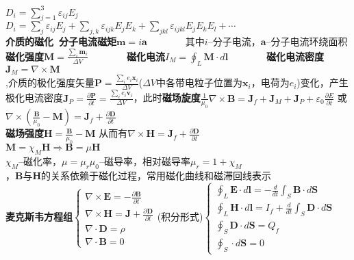 \documentclass[10pt,a4paper]{article}
\begin{document}
\begin{multicols}{2}
\indent{}$D_i=\sum_{j=1}^3\varepsilon_{ij}E_{j}$\scriptsize\\
\indent{}$D_i=\sum_{j}\varepsilon_{ij}E_j+\sum_{j,k}\varepsilon_{ijk}E_jE_k+\sum_{jkl}\varepsilon_{ijkl}E_jE_kE_l+\cdots$\scriptsize\\
\textbf{介质的磁化~分子电流磁矩}$\bm{m}=i\bm{a}$~~~~~~~~其中$i$--分子电流，$\bm{a}$--分子电流环绕面积\\
\indent\textbf{磁化强度}$\bm{M}=\frac{\sum_i\bm{m}_i}{\Delta V}$~~~~~~~~\textbf{磁化电流}$I_M=\oint_L\bm{M}\cdot d\bm{l}$~~~~~~~~\textbf{磁化电流密度}$\bm{J}_M=\nabla\times\bm{M}$\\
\indent{},介质的极化强度矢量$\bm{P}=\frac{\sum_ie_i\bm{x}_i}{\Delta V}$($\Delta V$中各带电粒子位置为$\bm{x}_i$，电荷为$e_i$)变化，产生极化电流密度$\bm{J}_P=\frac{\partial\bm{P}}{\partial t}=\frac{\sum_ie_i\bm{v}_i}{\Delta V}$，此时\textbf{磁场旋度}$\frac{1}{\mu_0}\nabla\times\bm{B}=\bm{J}_f+\bm{J}_M+\bm{J}_P+\varepsilon_0\frac{\partial E}{\partial t}$ 或 \scriptsize$\nabla\times(\frac{\bm{B}}{\mu_0}-\bm{M})=\bm{J}_f+\frac{\partial\bm{D}}{\partial t}$\\
\textbf{磁场强度}$\bm{H}=\frac{\bm{B}}{\mu_0}-\bm{M}$ 从而有$\nabla\times\bm{H}=\bm{J}_f+\frac{\partial\bm{D}}{\partial t}$\\
$\bm{M}=\chi_M\bm{H}\Rightarrow\bm{B}=\mu\bm{H}$\\
\indent{}$\chi_M$--磁化率，$\mu=\mu_r\mu_0$--磁导率，相对磁导率$\mu_r=1+\chi_M$\\
\indent{}，$\bm{B}$与$\bm{H}$的关系依赖于磁化过程，常用磁化曲线和磁滞回线表示\scriptsize\\
\textbf{麦克斯韦方程组}$\left\{\begin{array}{l}\nabla\times\bm{E}=-\frac{\partial\bm{B}}{\partial t}\\\nabla\times\bm{H}=\bm{J}+\frac{\partial\bm{D}}{\partial t}\\\nabla\cdot\bm{D}=\rho\\\nabla\cdot\bm{B}=0\end{array}\right.$(积分形式)$\left\{\begin{array}{l}\oint_L\bm{E}\cdot d\bm{l}=-\frac{d}{dt}\int_S\bm{B}\cdot d\bm{S}\\\oint_L\bm{H}\cdot d\bm{l}=I_f+\frac{d}{dt}\int_S\bm{D}\cdot d\bm{S}\\\oint_S\bm{D}\cdot d\bm{S}=Q_f\\\oint_S\cdot d\bm{S}=0\end{array}\right.$\\

\end{multicols}
\end{document}
